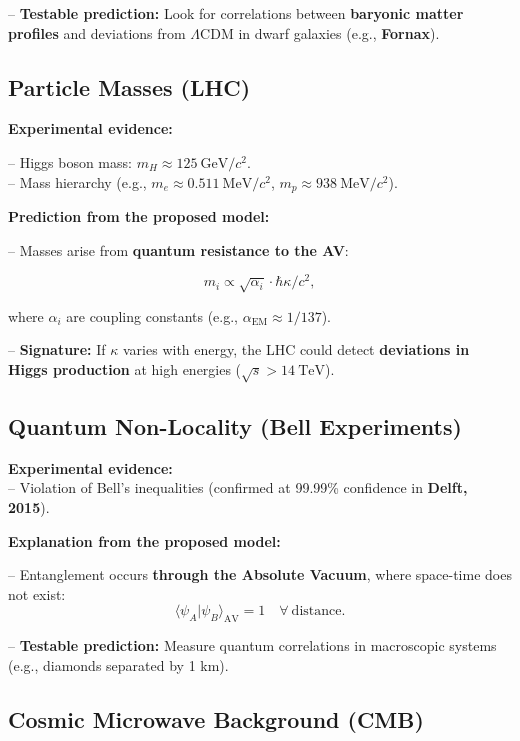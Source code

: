 \documentclass[a4paper]{article}
\theoremstyle{definition}
\theoremstyle{remark}
\numberwithin{equation}{section}
\begin{document}
– \textbf{Testable prediction:} Look for correlations between \textbf{baryonic matter profiles} and deviations from \( \Lambda \)CDM in dwarf galaxies (e.g., \textbf{Fornax}).

\subsection{Particle Masses (LHC)}

\textbf{Experimental evidence:}

– Higgs boson mass: \( m_H \approx 125 \ \text{GeV}/c^2 \).\\

– Mass hierarchy (e.g., \( m_e \approx 0.511 \ \text{MeV}/c^2 \), \( m_p \approx 938 \ \text{MeV}/c^2 \)).

\textbf{Prediction from the proposed model:}

– Masses arise from \textbf{quantum resistance to the AV}:

\[
m_i \propto \sqrt{\alpha_i} \cdot \hbar \kappa / c^2,
\]

where \( \alpha_i \) are coupling constants (e.g., \( \alpha_{\text{EM}} \approx 1/137 \)).

– \textbf{Signature:} If \( \kappa \) varies with energy, the LHC could detect \textbf{deviations in Higgs production} at high energies (\( \sqrt{s} > 14 \ \text{TeV} \)).

	
\subsection{Quantum Non-Locality (Bell Experiments)}

\textbf{Experimental evidence:} \\

– Violation of Bell's inequalities (confirmed at 99.99\% confidence in \textbf{Delft, 2015}).

\textbf{Explanation from the proposed model:}

– Entanglement occurs \textbf{through the Absolute Vacuum}, where space-time does not exist:
\[
\langle \psi_A | \psi_B \rangle_{\text{AV}} = 1 \quad \forall \ \text{distance}.
\]

– \textbf{Testable prediction:} Measure quantum correlations in macroscopic systems (e.g., diamonds separated by 1 km).

\subsection{Cosmic Microwave Background (CMB)}
\end{document}
